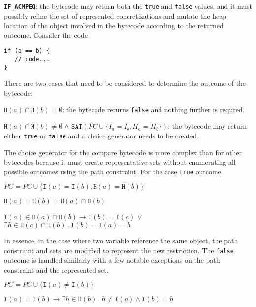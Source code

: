 \noindent \textbf{\texttt{IF\_ACMPEQ}}: the bytecode may return both the \texttt{true} and \texttt{false} values, and it must possibly refine the set of represented concretizations and mutate the heap location of the object involved in the bytecode according to the returned outcome. Consider the code
\begin{lstlisting}
if (a == b) {
   // code...
}
\end{lstlisting}
There are two cases that need to be considered to determine the outcome of the bytecode:
\begin{compactenum}
\item $\mathtt{H}(a) \cap \mathtt{H}(b) = \emptyset$: the bytecode returns \texttt{false} and nothing further is requred.
\item $\mathtt{H}(a) \cap \mathtt{H}(b) \not = \emptyset$ $\wedge$ $\mathtt{SAT}(PC \cup \{I_a = I_b, H_a = H_b\})$: the bytecode may return either \texttt{true} or \texttt{false} and a choice generator needs to be created.
\end{compactenum}
The choice generator for the compare bytecode is more complex than for other bytecodes because it must create representative sets without enumerating all possible outcomes using the path constraint. For the case \texttt{true} outcome
\begin{compactitem}
\item $\mathit{PC} = \mathit{PC} \cup \{\mathtt{I}(a) = \mathtt{I}(b),\mathtt{H}(a) = \mathtt{H}(b)\}$
\item $\mathtt{H}(a) = \mathtt{H}(b) = \mathtt{H}(a) \cap \mathtt{H}(b)$
\item $\mathtt{I}(a) \in \mathtt{H}(a) \cap \mathtt{H}(b) \rightarrow \mathtt{I}(b) = \mathtt{I}(a)$ $\vee$ $\exists h \in \mathtt{H}(a) \cap \mathtt{H}(b)\ .\ \mathtt{I}(b) = \mathtt{I}(a) = h$
\end{compactitem}
In essence, in the case where two variable reference the same object, the path constraint and sets are modified to represent the new restriction. The \texttt{false} outcome is handled similarly with a few notable exceptions on the path constraint and the represented set.
\begin{compactitem}
\item $\mathit{PC} = \mathit{PC} \cup \{\mathtt{I}(a) \not = \mathtt{I}(b)\}$
\item $\mathtt{I}(a) = \mathtt{I}(b) \rightarrow \exists h \in \mathtt{H}(b)\ .\ h \not = \mathtt{I}(a) \wedge \mathtt{I}(b) = h$
\end{compactitem}

